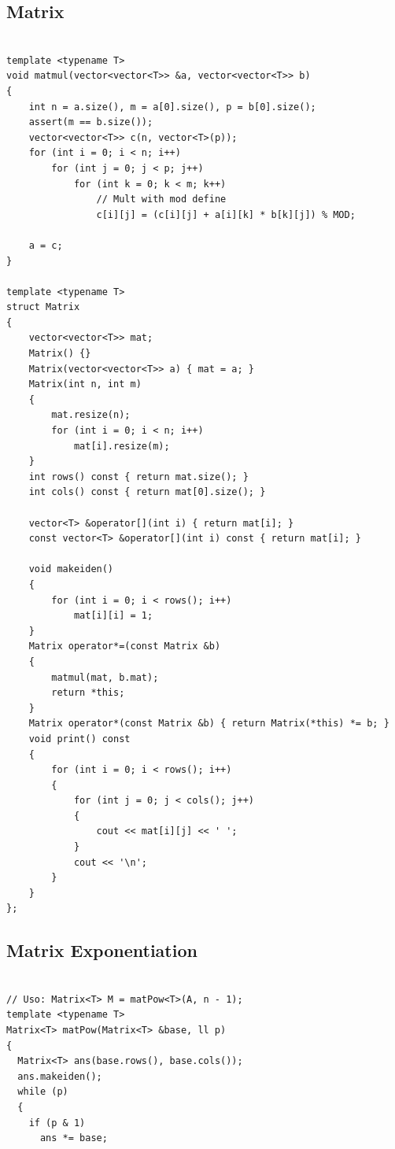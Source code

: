 \documentclass[twoside]{article}
\begin{document}
\begin{multicols*}{2}
	{
		\subsection*{Matrix}
	}
	\begin{verbatim}

template <typename T>
void matmul(vector<vector<T>> &a, vector<vector<T>> b)
{
    int n = a.size(), m = a[0].size(), p = b[0].size();
    assert(m == b.size());
    vector<vector<T>> c(n, vector<T>(p));
    for (int i = 0; i < n; i++)
        for (int j = 0; j < p; j++)
            for (int k = 0; k < m; k++)
                // Mult with mod define
                c[i][j] = (c[i][j] + a[i][k] * b[k][j]) % MOD;

    a = c;
}

template <typename T>
struct Matrix
{
    vector<vector<T>> mat;
    Matrix() {}
    Matrix(vector<vector<T>> a) { mat = a; }
    Matrix(int n, int m)
    {
        mat.resize(n);
        for (int i = 0; i < n; i++)
            mat[i].resize(m);
    }
    int rows() const { return mat.size(); }
    int cols() const { return mat[0].size(); }

    vector<T> &operator[](int i) { return mat[i]; }
    const vector<T> &operator[](int i) const { return mat[i]; }

    void makeiden()
    {
        for (int i = 0; i < rows(); i++)
            mat[i][i] = 1;
    }
    Matrix operator*=(const Matrix &b)
    {
        matmul(mat, b.mat);
        return *this;
    }
    Matrix operator*(const Matrix &b) { return Matrix(*this) *= b; }
    void print() const
    {
        for (int i = 0; i < rows(); i++)
        {
            for (int j = 0; j < cols(); j++)
            {
                cout << mat[i][j] << ' ';
            }
            cout << '\n';
        }
    }
};

\end{verbatim}

	{
		\subsection*{Matrix Exponentiation}
	}
	\begin{verbatim}

// Uso: Matrix<T> M = matPow<T>(A, n - 1);
template <typename T>
Matrix<T> matPow(Matrix<T> &base, ll p)
{
  Matrix<T> ans(base.rows(), base.cols());
  ans.makeiden();
  while (p)
  {
    if (p & 1)
      ans *= base;


\end{verbatim}
\end{multicols*}
\end{document}
